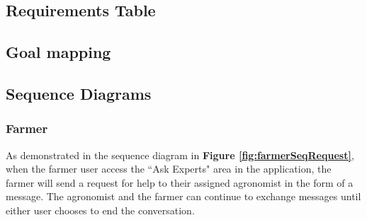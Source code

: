 

\subsection{Requirements Table}




\subsection{Goal mapping}




\newpage
\subsection{Sequence Diagrams}

\subsubsection{Farmer}

\begin{flushleft}
As demonstrated in the sequence diagram in \textbf{Figure \ref{fig:farmerSeqRequest}}, when the farmer user access the “Ask Experts" area in the application, the farmer will send a request for help to their assigned agronomist in the form of a message. The agronomist and the farmer can continue to exchange messages until either user chooses to end the conversation.
\end{flushleft}

